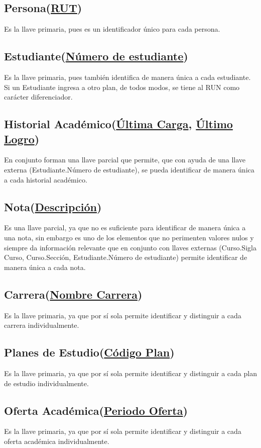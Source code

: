 \documentclass[12pt]{article}
\begin{document}
\subsection*{Persona(\underline{RUT})}
Es la llave primaria, pues es un identificador único para cada persona.  
\subsection*{Estudiante(\underline{Número de estudiante})}
Es la llave primaria, pues también identifica de manera única a cada estudiante. Si un Estudiante ingresa a otro plan, de todos modos, se tiene al RUN como carácter diferenciador. 
\subsection*{Historial Académico(\underline{Última Carga}, \underline{Último Logro})}
En conjunto forman una llave parcial que permite, que con ayuda de una llave externa (Estudiante.Número de estudiante), se pueda identificar de manera única a cada historial académico.
\subsection*{Nota(\underline{Descripción})}
Es una llave parcial, ya que no es suficiente para identificar de manera única a una nota, sin embargo
es uno de los elementos que no perimenten valores nulos y siempre da información relevante que en conjunto con llaves externas (Curso.Sigla Curso, Curso.Sección, Estudiante.Número de estudiante) permite identificar de manera única a cada nota.
\subsection*{Carrera(\underline{Nombre Carrera})}
Es la llave primaria, ya que por sí sola permite identificar y distinguir a cada carrera individualmente.
\subsection*{Planes de Estudio(\underline{Código Plan})}
Es la llave primaria, ya que por sí sola permite identificar y distinguir a cada plan de estudio individualmente.
\subsection*{Oferta Académica(\underline{Periodo Oferta})}
Es la llave primaria, ya que por sí sola permite identificar y distinguir a cada oferta académica individualmente.
\end{document}
